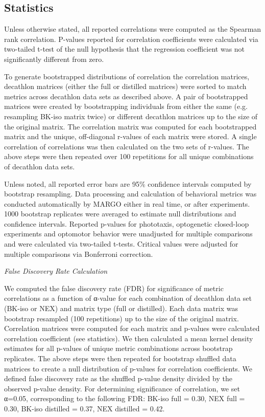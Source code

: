 \documentclass[12pt,letterpaper]{article}
\begin{document}
\subsection{Statistics}

Unless otherwise stated, all reported correlations were computed as the Spearman rank correlation. P-values reported for correlation coefficients were calculated via two-tailed t-test of the null hypothesis that the regression coefficient was not significantly different from zero.

To generate bootstrapped distributions of correlation the correlation matrices, decathlon matrices (either the full or distilled matrices) were sorted to match metrics across decathlon data sets as described above. A pair of bootstrapped matrices were created by bootstrapping individuals from either the same (e.g. resampling BK-iso matrix twice) or different decathlon matrices up to the size of the original matrix. The correlation matrix was computed for each bootstrapped matrix and the unique, off-diagonal r-values of each matrix were stored. A single correlation of correlations was then calculated on the two sets of r-values. The above steps were then repeated over 100 repetitions for all unique combinations of decathlon data sets.

Unless noted, all reported error bars are 95\% confidence intervals computed by bootstrap resampling. Data processing and calculation of behavioral metrics was conducted automatically by MARGO either in real time, or after experiments. 1000 bootstrap replicates were averaged to estimate null distributions and confidence intervals. Reported p-values for phototaxis, optogenetic closed-loop experiments and optomotor behavior were unadjusted for multiple comparisons and were calculated via two-tailed t-tests. Critical values were adjusted for multiple comparisons via Bonferroni correction.

\textit{False Discovery Rate Calculation}

We computed the false discovery rate (FDR) for significance of metric correlations as a function of α-value for each combination of decathlon data set (BK-iso or NEX) and matrix type (full or distilled). Each data matrix was bootstrap resampled (100 repetitions) up to the size of the original matrix. Correlation matrices were computed for each matrix and p-values were calculated correlation coefficient (see statistics). We then calculated a mean kernel density estimates for all p-values of unique metric combinations across bootstrap replicates. The above steps were then repeated for bootstrap shuffled data matrices to create a null distribution of p-values for correlation coefficients. We defined false discovery rate as the shuffled p-value density divided by the observed p-value density. For determining significance of correlation, we set α=0.05, corresponding to the following FDR: BK-iso full = 0.30, NEX full = 0.30, BK-iso distilled = 0.37, NEX distilled = 0.42. 
\end{document}
